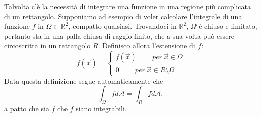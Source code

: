 \documentclass[10pt]{article}
\theoremstyle{plain}
\theoremstyle{definition}
\begin{document}
Talvolta c'è la necessità di integrare una funzione in una regione più complicata di un rettangolo. Supponiamo ad esempio di voler calcolare l'integrale di una funzione $f$ in $\Omega \subset \mathbb{R}^2$, compatto qualsiasi. Trovandoci in $\mathbb{R}^2$, $\Omega$ è chiuso e limitato, pertanto sta in una palla chiusa di raggio finito, che a sua volta può essere circoscritta in un rettangolo $R$. Definisco allora l'estensione di $f$:
\begin{equation}
  \bar{f}(\vec{x})=
   \begin{cases}
   f(\vec{x})\qquad \ per \ \vec{x} \in \Omega \\0 \qquad \ per \ \vec{x} \in R\setminus \Omega
   \end{cases}
\end{equation}
Data questa definizione segue automaticamente che
$$\int_\Omega fd\mathcal{A} = \int_R \bar{f}d\mathcal{A},$$
a patto che sia $f$ che $\bar{f}$ siano integrabili.
\end{document}
